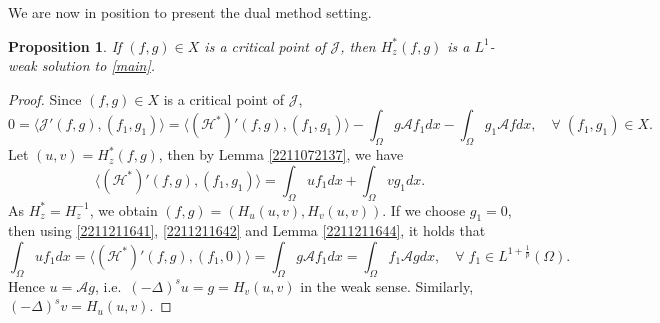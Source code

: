 \documentclass[10pt]{article}
\numberwithin{equation}{section}
\newtheorem{proposition}[theorem]{Proposition}
\numberwithin{equation}{section}
\begin{document}
We are now in position to present the dual method setting.
\begin{proposition}\label{2211171427}
If $(f, g)\in X$ is a critical point of $\mathcal{J}$, then ${H}_z^{*}(f, g)$ is a $L^1$-weak solution to \eqref{main}.
\end{proposition}
\begin{proof}
Since $(f, g)\in X$ is a critical point of $\mathcal{J}$,
\begin{equation}\label{2211211641}
0=\langle \mathcal{J}'(f, g), (f_1, g_1) \rangle=\langle (\mathcal{H}^*)'(f, g), (f_1 , g_1 )\rangle-\int_{\Omega}g\mathcal{A}f_1 dx-\int_{\Omega}g_1\mathcal{A}f dx,\quad \forall\; (f_1, g_1)\in X.
\end{equation}
Let $(u, v)=H_z^*(f, g)$, then by Lemma \ref{2211072137}, we have
\begin{equation}\label{2211211642}
\langle (\mathcal{H}^*)'(f, g), (f_1 , g_1 )\rangle=\int_{\Omega}uf_1 dx +\int_{\Omega}v g_1 dx.
\end{equation}
As $H_z^*=H_z^{-1}$, we obtain
$(f, g)=(H_u(u, v), H_v(u,v))$.
If we choose $g_1=0$, then using \eqref{2211211641}, \eqref{2211211642} and Lemma \ref{2211211644}, it holds that
\[
\int_{\Omega}uf_1 dx=\langle (\mathcal{H}^*)'(f, g), (f_1, 0) \rangle=\int_{\Omega}g\mathcal{A}f_1 dx=\int_{\Omega}f_1\mathcal{A}g dx, \quad \forall\; f_1 \in L^{1+\frac{1}{p}}(\Omega).
\]
Hence $u=\mathcal{A}g$, i.e.~$(-\Delta)^s u=g=H_v(u, v)$ in the weak sense. 
Similarly, $(-\Delta)^s v=H_u(u, v)$.
\end{proof}
\end{document}
